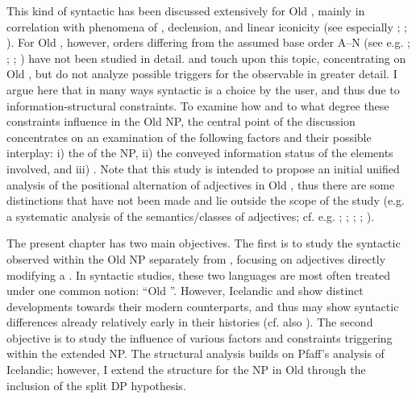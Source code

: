 \documentclass[output=paper,colorlinks,citecolor=brown]{langscibook}
\begin{document}
This kind of syntactic  has been discussed extensively for Old
, mainly in correlation with phenomena of ,
declension, and linear iconicity (see especially \citealp{Fischer00,Fischer06,Fischer12}; \citealp{Haumann03,Haumann10}; \citealp{Bech19}). For Old , however, orders
differing from the assumed base order A--N (see e.g. \citealp{Nygaard05}; \citealp{Ringdal1918}; \citealp[68]{Faarlund04}; \citealp[394]{Mørck2016}) have not been studied
in detail.  and \citet{Bech17} touch upon
this topic, concentrating on Old , but do not analyze possible
triggers for the observable  in greater detail. I argue here
that in many ways syntactic  is a choice by the user, and thus
due to information-structural constraints. To examine how and to what
degree these constraints influence  in the Old  NP,
the central point of the discussion concentrates on an examination of the following factors and their possible interplay: i) the  of the
NP, ii) the conveyed information status of the elements involved, and iii)
. Note that this study is intended to propose an initial 
unified analysis of the positional alternation of adjectives in Old
, thus there are some distinctions that have not been made and
lie outside the scope of the study (e.g. a systematic analysis of the
semantics/classes of adjectives; cf. e.g. \citealp{Cinque1994}; \citealp{Dimitrova-Vulchanova2003}; \citealp{LarsonMarušič2004}; \citealp{Laenzlinger2005}; \citealp{AlexiadouHaegemonStavrou2007}).

The present chapter has two main objectives. The first is to study
the syntactic  observed within the Old  NP separately from
, focusing on adjectives directly modifying a . In
syntactic studies, these two languages are most often treated under one
common notion: ``Old ''. However, Icelandic and  show
distinct developments towards their modern counterparts, and thus may
show syntactic differences already relatively early in their 
histories (cf. also \citealp{Tiemann2022}). The second objective is to study the
influence of various factors and constraints triggering  within
the extended NP. The structural analysis builds on Pfaff's \citeyearpar{Pfaff2015,Pfaff2019}
analysis of Icelandic; however, I extend the structure for the NP in Old
 through the inclusion of the split DP hypothesis.
\end{document}
